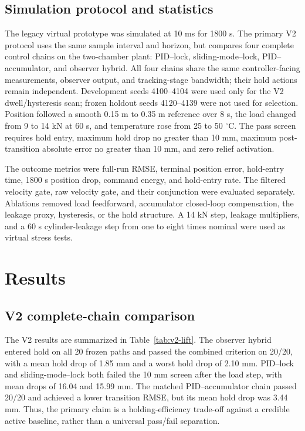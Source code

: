 \documentclass[machines,article,submit,pdftex,moreauthors]{Definitions/mdpi}
\begin{document}
\subsection{Simulation protocol and statistics}
The legacy virtual prototype was simulated at 10 ms for 1800 s. The primary V2 protocol uses the same sample interval and horizon, but compares four complete control chains on the two-chamber plant: PID--lock, sliding-mode--lock, PID--accumulator, and observer hybrid. All four chains share the same controller-facing measurements, observer output, and tracking-stage bandwidth; their hold actions remain independent. Development seeds 4100--4104 were used only for the V2 dwell/hysteresis scan; frozen holdout seeds 4120--4139 were not used for selection. Position followed a smooth 0.15 m to 0.35 m reference over 8 s, the load changed from 9 to 14 kN at 60 s, and temperature rose from 25 to 50 $^\circ$C. The pass screen requires hold entry, maximum hold drop no greater than 10 mm, maximum post-transition absolute error no greater than 10 mm, and zero relief activation.

The outcome metrics were full-run RMSE, terminal position error, hold-entry time, 1800 s position drop, command energy, and hold-entry rate. The filtered velocity gate, raw velocity gate, and their conjunction were evaluated separately. Ablations removed load feedforward, accumulator closed-loop compensation, the leakage proxy, hysteresis, or the hold structure. A 14 kN step, leakage multipliers, and a 60 s cylinder-leakage step from one to eight times nominal were used as virtual stress tests.

\section{Results}
\subsection{V2 complete-chain comparison}
The V2 results are summarized in Table~\ref{tab:v2-lift}. The observer hybrid entered hold on all 20 frozen paths and passed the combined criterion on 20/20, with a mean hold drop of 1.85 mm and a worst hold drop of 2.10 mm. PID--lock and sliding-mode--lock both failed the 10 mm screen after the load step, with mean drops of 16.04 and 15.99 mm. The matched PID--accumulator chain passed 20/20 and achieved a lower transition RMSE, but its mean hold drop was 3.44 mm. Thus, the primary claim is a holding-efficiency trade-off against a credible active baseline, rather than a universal pass/fail separation.
\end{document}
